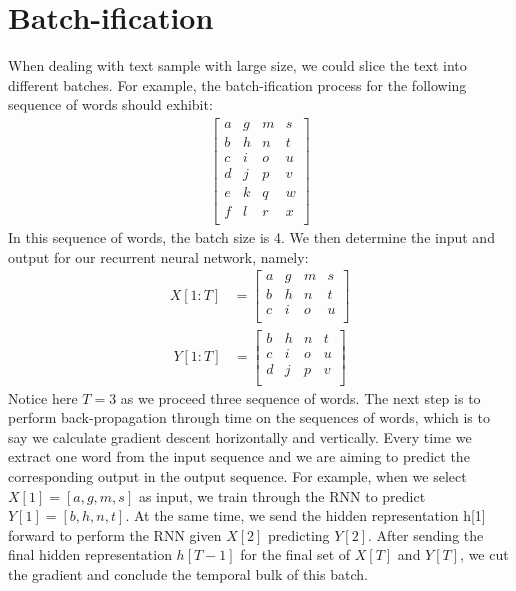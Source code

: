 \section{Batch-ification}
When dealing with text sample with large size, we could slice the text into different batches. For example, the batch-ification process for the following sequence of words should exhibit:\\
\begin{align*}
\begin{bmatrix}
    a & g & m & s\\
    b & h & n & t\\
    c & i & o & u\\
    d & j & p & v\\
    e & k & q & w\\
    f & l & r & x\\
\end{bmatrix}
\end{align*}
In this sequence of words, the batch size is 4. We then determine the input and output for our recurrent neural network, namely:\\
\begin{align*}
X[1:T] & = \begin{bmatrix}
        a & g & m & s\\
        b & h & n & t\\
        c & i & o & u\\
\end{bmatrix}
\end{align*}
\begin{align*}
Y[1:T] & = \begin{bmatrix}
        b & h & n & t\\
        c & i & o & u\\
        d & j & p & v\\
\end{bmatrix}
\end{align*}
Notice here $T = 3$ as we proceed three sequence of words. The next step is to perform back-propagation through time on the sequences of words, which is to say we calculate gradient descent horizontally and vertically. Every time we extract one word from the input sequence and we are aiming to predict the corresponding output in the output sequence. For example, when we select $X[1] = [a, g, m, s]$ as input, we train through the RNN to predict $Y[1] = [b, h, n, t]$. At the same time, we send the hidden representation h[1] forward to perform the RNN given $X[2]$ predicting $Y[2]$. After sending the final hidden representation $h[T-1]$ for the final set of $X[T]$ and $Y[T]$, we cut the gradient and conclude the temporal bulk of this batch. \\

